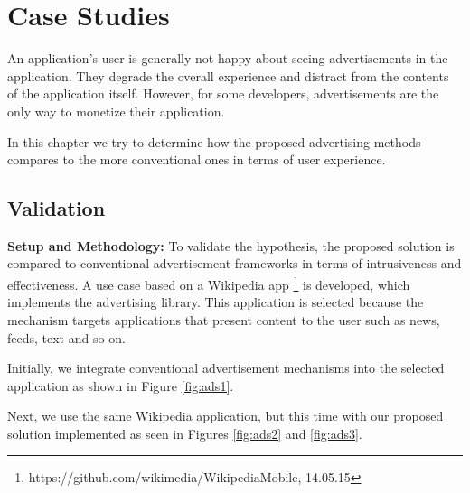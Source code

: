 \chapter{Case Studies}

An application's user is generally not happy about seeing advertisements in the application. They degrade the overall experience and distract from the contents of the application itself. However, for some developers, advertisements are the only way to monetize their application.

In this chapter we try to determine how the proposed advertising methods compares to the more conventional ones in terms of user experience.

\section{Validation}

\textbf{Setup and Methodology:} To validate the hypothesis, the proposed solution is compared to conventional advertisement frameworks in terms of intrusiveness and effectiveness. A use case based on a Wikipedia app \footnote[41]{https://github.com/wikimedia/WikipediaMobile, 14.05.15} is developed, which implements the advertising library. This application is selected because the mechanism targets applications that present content to the user such as news, feeds, text and so on.

Initially, we integrate  conventional advertisement mechanisms into the selected application as shown in Figure \ref{fig:ads1}.

Next, we use the same Wikipedia application, but this time with our proposed solution implemented as seen in Figures \ref{fig:ads2} and \ref{fig:ads3}.


